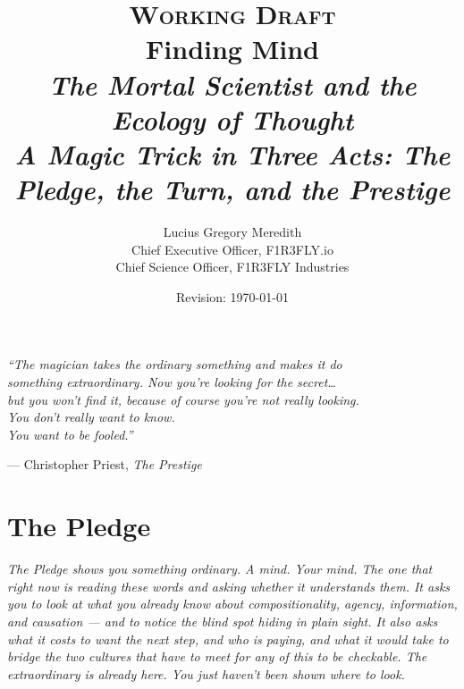 \documentclass[12pt,openright,twoside]{book}
\title{%
  \vspace{-0.8in}
  {\large\scshape Working Draft}\\[0.6em]
  {\Huge\bfseries Finding Mind}\\[0.5em]
  {\Large\itshape The Mortal Scientist and the Ecology of Thought}\\[0.4em]
  {\large\itshape A Magic Trick in Three Acts: The Pledge, the Turn, and the Prestige}
}
\author{%
  Lucius Gregory Meredith\\[0.3em]
  {\small Chief Executive Officer, F1R3FLY.io}\\
  {\small Chief Science Officer, F1R3FLY Industries}
}
\date{Revision: \today}
\theoremstyle{remark}
\theoremstyle{plain}
\theoremstyle{remark}
\theoremstyle{plain}
\theoremstyle{plain}
\begin{document}

\maketitle
\thispagestyle{empty}

\newpage
\thispagestyle{empty}
\vspace*{\fill}
\begin{center}
  \large\itshape
  ``The magician takes the ordinary something and makes it do\\
  something extraordinary. Now you're looking for the secret\ldots{}\\
  but you won't find it, because of course you're not really looking.\\
  You don't really want to know.\\
  You want to be fooled.''
  \medskip

  \normalsize\upshape --- Christopher Priest, \textit{The Prestige}
\end{center}
\vspace*{\fill}
\newpage

\tableofcontents
\newpage

\part{The Pledge}

\vspace{1em}
\begin{mdframed}[backgroundcolor=remarkgray, linecolor=gray!60,
                 linewidth=1pt, topline=false, rightline=false,
                 bottomline=false]
\small\itshape
The Pledge shows you something ordinary.
A mind. Your mind.
The one that right now is reading these words and asking whether it
understands them.
It asks you to look at what you already know about compositionality,
agency, information, and causation --- and to notice the blind spot
hiding in plain sight.
It also asks what it costs to want the next step, and who is paying,
and what it would take to bridge the two cultures that have to meet
for any of this to be checkable.
The extraordinary is already here.
You just haven't been shown where to look.
\end{mdframed}
\end{document}
